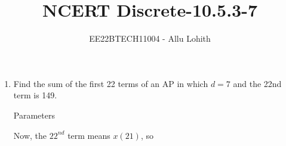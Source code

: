 \documentclass[journal,12pt,twocolumn]{IEEEtran}
\theoremstyle{remark}
\begin{document}

\vspace{3cm}

\title{NCERT Discrete-10.5.3-7}
\author{EE22BTECH11004 - Allu Lohith}

\maketitle
\newpage
\bigskip

\renewcommand{\thefigure}{\theenumi}
\renewcommand{\thetable}{\theenumi}
\begin{enumerate}
\item
Find the sum of the first 22 terms of an AP in which $d = 7$ and the 22nd term is 149.
\solution


\fi
\begin{table}[h!]
\centering

\vspace{0.5cm}
\caption{\normalsize Parameters}
\end{table}

Now, the $22^{nd}$ term means $x(21)$, so


\end{enumerate}
\end{document}
